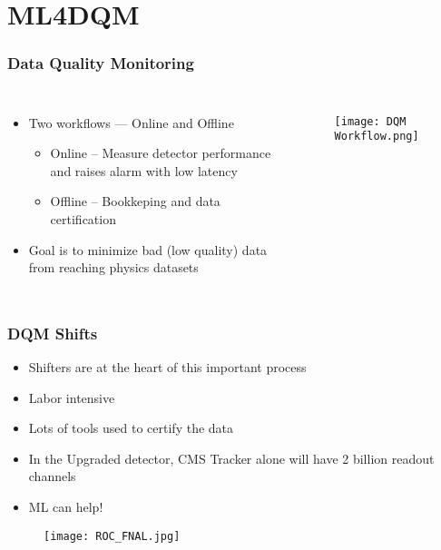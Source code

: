 \documentclass[aspectratio=1610]{beamer}
\begin{document}
\section{ML4DQM}
\begin{frame}
	\frametitle{Data Quality Monitoring}
	\begin{columns}
		\begin{itemize}
			\item Two workflows --- Online and Offline
			      \begin{itemize}
				      \item Online -- Measure detector performance and raises alarm with low latency
				      \item Offline -- Bookkeping and data certification
			      \end{itemize}
			\item Goal is to minimize bad (low quality) data from reaching physics datasets
		\end{itemize}
		\begin{figure}
			\centering
			\texttt{[image: DQM Workflow.png]}
		\end{figure}
	\end{columns}
\end{frame}
\begin{frame}
	\frametitle{DQM Shifts}
	\begin{itemize}
		\item Shifters are at the heart of this important process
		\item Labor intensive
		\item Lots of tools used to certify the data
		\item In the Upgraded detector, CMS Tracker alone will have 2 billion readout channels
		\item ML can help!
	\end{itemize}
	\begin{figure}
		\begin{center}
			\texttt{[image: ROC\_FNAL.jpg]}
		\end{center}
	\end{figure}

\end{frame}
\end{document}
